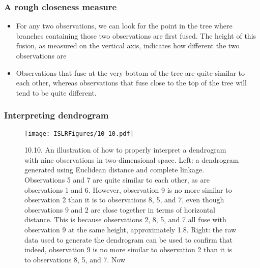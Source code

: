\documentclass{beamer}
\begin{document}
                 \begin{frame}
                 	\frametitle{A rough closeness measure}
                 	\begin{itemize}
                 		\item  For any two observations, we can look for the point in
                 		the tree where branches containing those two observations are first fused.
                 		The height of this fusion, as measured on the vertical axis, indicates how
                 		different the two observations are
                 		\item Observations that fuse at the very
                 		bottom of the tree are quite similar to each other, whereas observations
                 		that fuse close to the top of the tree will tend to be quite different. 
                 		
                 	 
                 		
                 	 
                 	\end{itemize}
                 \end{frame}   
                 
                           
                           
                           \begin{frame}
                           	\frametitle{Interpreting dendrogram}
                           	\begin{figure}
                           		\centering
                           		
                           		\centering
                           		\texttt{[image: ISLRFigures/10\_10.pdf]}
                           		\caption{\scriptsize 10.10. An illustration of how to properly interpret a dendrogram with
                           			nine observations in two-dimensional space. Left: a dendrogram generated using
                           			Euclidean distance and complete linkage. Observations 5 and 7 are quite similar
                           			to each other, as are observations 1 and 6. However, observation 9 is no more
                           			similar to observation 2 than it is to observations 8, 5, and 7, even though observations
                           			9 and 2 are close together in terms of horizontal distance. This is because
                           			observations 2, 8, 5, and 7 all fuse with observation 9 at the same height, approximately
                           			1.8. Right: the raw data used to generate the dendrogram can be used to
                           			confirm that indeed, observation 9 is no more similar to observation 2 than it is
                           			to observations 8, 5, and 7.
                           			Now
                           		}
                           		
                           		
                           	\end{figure}
                           \end{frame} 
                           
\end{document}
